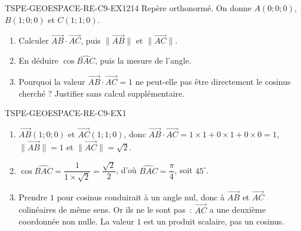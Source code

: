
\begin{exercice}{TSPE-GEOESPACE-RE-C9-EX1}{2}{14}
Repère orthonormé. On donne $A(0;0;0)$, $B(1;0;0)$ et $C(1;1;0)$.
\begin{enumerate}
  \item Calculer $\vec{AB}\cdot\vec{AC}$, puis $\lVert\vec{AB}\rVert$ et
        $\lVert\vec{AC}\rVert$.
  \item En déduire $\cos\widehat{BAC}$, puis la mesure de l'angle.
  \item Pourquoi la valeur $\vec{AB}\cdot\vec{AC}=1$ ne peut-elle pas être
        directement le cosinus cherché ? Justifier sans calcul supplémentaire.
\end{enumerate}
\end{exercice}


\begin{corrige}{TSPE-GEOESPACE-RE-C9-EX1}
\begin{enumerate}
  \item $\vec{AB}(1;0;0)$ et $\vec{AC}(1;1;0)$, donc
        $\vec{AB}\cdot\vec{AC}=1\times1+0\times1+0\times0=1$,
        $\lVert\vec{AB}\rVert=1$ et $\lVert\vec{AC}\rVert=\sqrt{2}$.
  \item $\cos\widehat{BAC}=\dfrac{1}{1\times\sqrt{2}}=\dfrac{\sqrt{2}}{2}$,
        d'où $\widehat{BAC}=\dfrac{\pi}{4}$, soit $45^\circ$.
  \item Prendre $1$ pour cosinus conduirait à un angle nul, donc à
        $\vec{AB}$ et $\vec{AC}$ colinéaires de même sens. Or ils ne le sont
        pas~: $\vec{AC}$ a une deuxième coordonnée non nulle. La valeur $1$
        est un produit scalaire, pas un cosinus.
\end{enumerate}
\end{corrige}
